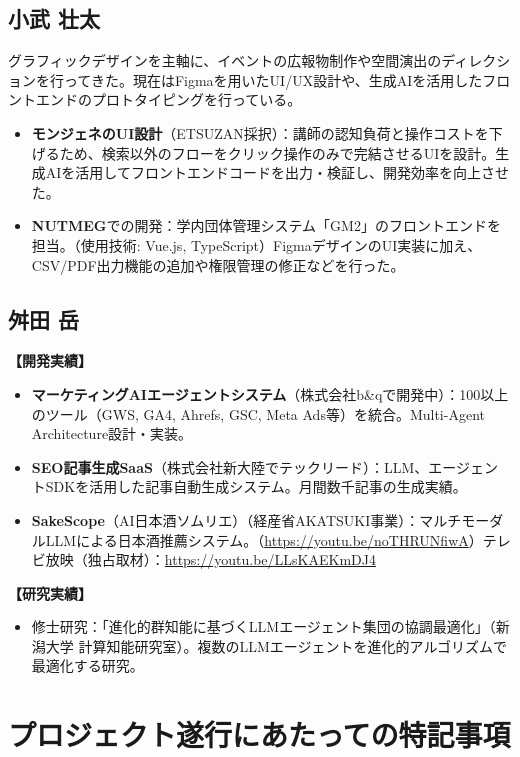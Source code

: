 \documentclass[paper=a4,fontsize=10.5bp,jafontsize=10.5bp,twocolumn]{jlreq}
\begin{document}
\subsection*{小武 壮太}

グラフィックデザインを主軸に、イベントの広報物制作や空間演出のディレクションを行ってきた。現在はFigmaを用いたUI/UX設計や、生成AIを活用したフロントエンドのプロトタイピングを行っている。

\begin{itemize}
  \item \textbf{モンジェネのUI設計}（ETSUZAN採択）：講師の認知負荷と操作コストを下げるため、検索以外のフローをクリック操作のみで完結させるUIを設計。生成AIを活用してフロントエンドコードを出力・検証し、開発効率を向上させた。
  \item \textbf{NUTMEG}での開発：学内団体管理システム「GM2」のフロントエンドを担当。（使用技術: Vue.js, TypeScript）FigmaデザインのUI実装に加え、CSV/PDF出力機能の追加や権限管理の修正などを行った。
\end{itemize}

\subsection*{舛田 岳}

\textbf{【開発実績】}
\begin{itemize}
  \item \textbf{マーケティングAIエージェントシステム}（株式会社b\&qで開発中）：100以上のツール（GWS, GA4, Ahrefs, GSC, Meta Ads等）を統合。Multi-Agent Architecture設計・実装。
  \item \textbf{SEO記事生成SaaS}（株式会社新大陸でテックリード）：LLM、エージェントSDKを活用した記事自動生成システム。月間数千記事の生成実績。
  \item \textbf{SakeScope}（AI日本酒ソムリエ）（経産省AKATSUKI事業）：マルチモーダルLLMによる日本酒推薦システム。（\url{https://youtu.be/noTHRUNfiwA}）テレビ放映（独占取材）：\url{https://youtu.be/LLsKAEKmDJ4}
\end{itemize}

\textbf{【研究実績】}
\begin{itemize}
  \item 修士研究：「進化的群知能に基づくLLMエージェント集団の協調最適化」（新潟大学 計算知能研究室）。複数のLLMエージェントを進化的アルゴリズムで最適化する研究。
\end{itemize}

\section{プロジェクト遂行にあたっての特記事項}
\end{document}
